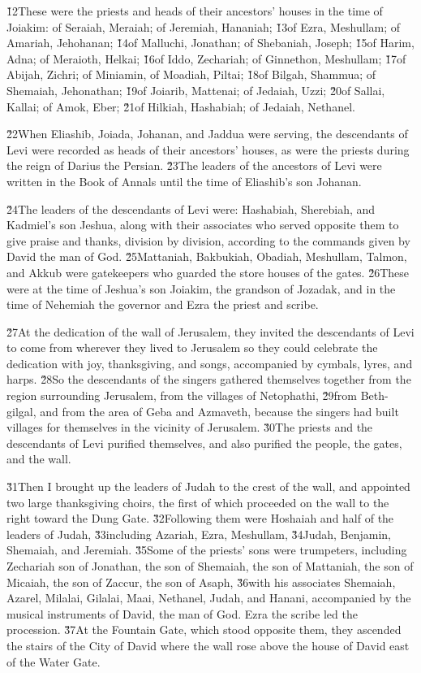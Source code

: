 \v{12}These were the priests and heads of their ancestors' houses in the time of Joiakim: of Seraiah, Meraiah; of Jeremiah, Hananiah; \v{13}of Ezra, Meshullam; of Amariah, Jehohanan; \v{14}of Malluchi, Jonathan; of Shebaniah, Joseph; \v{15}of Harim, Adna; of Meraioth, Helkai; \v{16}of Iddo, Zechariah; of Ginnethon, Meshullam; \v{17}of Abijah, Zichri; of Miniamin, of Moadiah, Piltai; \v{18}of Bilgah, Shammua; of Shemaiah, Jehonathan; \v{19}of Joiarib, Mattenai; of Jedaiah, Uzzi; \v{20}of Sallai, Kallai; of Amok, Eber; \v{21}of Hilkiah, Hashabiah; of Jedaiah, Nethanel.

\v{22}When Eliashib, Joiada, Johanan, and Jaddua were serving, the descendants of Levi were recorded as heads of their ancestors' houses, as were the priests during the reign of Darius the Persian. \v{23}The leaders of the ancestors of Levi were written in the Book of Annals until the time of Eliashib's son Johanan.

\v{24}The leaders of the descendants of Levi were: Hashabiah, Sherebiah, and Kadmiel's son Jeshua, along with their associates who served opposite them to give praise and thanks, division by division, according to the commands given by David the man of God. \v{25}Mattaniah, Bakbukiah, Obadiah, Meshullam, Talmon, and Akkub were gatekeepers who guarded the store houses of the gates. \v{26}These were at the time of Jeshua's son Joiakim, the grandson of Jozadak, and in the time of Nehemiah the governor and Ezra the priest and scribe.

\v{27}At the dedication of the wall of Jerusalem, they invited the descendants of Levi to come from wherever they lived to Jerusalem so they could celebrate the dedication with joy, thanksgiving, and songs, accompanied by cymbals, lyres, and harps. \v{28}So the descendants of the singers gathered themselves together from the region surrounding Jerusalem, from the villages of Netophathi, \v{29}from Beth-gilgal, and from the area of Geba and Azmaveth, because the singers had built villages for themselves in the vicinity of Jerusalem. \v{30}The priests and the descendants of Levi purified themselves, and also purified the people, the gates, and the wall.

\v{31}Then I brought up the leaders of Judah to the crest of the wall, and appointed two large thanksgiving choirs, the first of which proceeded on the wall to the right toward the Dung Gate. \v{32}Following them were Hoshaiah and half of the leaders of Judah, \v{33}including Azariah, Ezra, Meshullam, \v{34}Judah, Benjamin, Shemaiah, and Jeremiah. \v{35}Some of the priests' sons were trumpeters, including Zechariah son of Jonathan, the son of Shemaiah, the son of Mattaniah, the son of Micaiah, the son of Zaccur, the son of Asaph, \v{36}with his associates Shemaiah, Azarel, Milalai, Gilalai, Maai, Nethanel, Judah, and Hanani, accompanied by the musical instruments of David, the man of God. Ezra the scribe led the procession. \v{37}At the Fountain Gate, which stood opposite them, they ascended the stairs of the City of David where the wall rose above the house of David east of the Water Gate.

